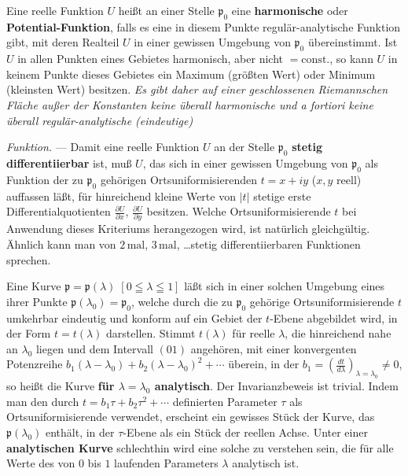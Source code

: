 \documentclass{article}
\begin{document}
Eine reelle Funktion $U$ heißt an einer Stelle $\mathfrak{p}_0$ eine \textbf{harmonische} oder \textbf{Potential-Funktion}, falls es eine in diesem Punkte regulär-analytische Funktion gibt, mit deren Realteil $U$ in einer gewissen Umgebung von $\mathfrak{p}_0$ übereinstimmt. Ist $U$ in allen Punkten eines Gebietes harmonisch, aber nicht $=\mathrm{const.}$, so kann $U$ in keinem Punkte dieses Gebietes ein Maximum (größten Wert) oder Minimum (kleinsten Wert) besitzen. \emph{Es gibt daher auf einer geschlossenen Riemannschen Fläche außer der Konstanten keine überall harmonische und a fortiori keine überall regulär-analytische (eindeutige)}

\emph{Funktion.} --- Damit eine reelle Funktion $U$ an der Stelle $\mathfrak{p}_0$ \textbf{stetig differentiierbar} ist, muß $U$, das sich in einer gewissen Umgebung von $\mathfrak{p}_0$ als Funktion der zu $\mathfrak{p}_0$ gehörigen Ortsuniformisierenden $t = x + iy$ ($x, y$ reell) auffassen läßt, für hinreichend kleine Werte von $|t|$ stetige erste Differentialquotienten $\frac{\partial U}{\partial x}$, $\frac{\partial U}{\partial y}$ besitzen. Welche Ortsuniformisierende $t$ bei Anwendung dieses Kriteriums herangezogen wird, ist natürlich gleichgültig. Ähnlich kann man von $2\,\text{mal}$, $3\,\text{mal}$, \ldots stetig differentiierbaren Funktionen sprechen.

Eine Kurve $\mathfrak{p} = \mathfrak{p}(\lambda)\;[0 \leqq \lambda \leqq 1]$ läßt sich in einer solchen Umgebung eines ihrer Punkte $\mathfrak{p}(\lambda_0) = \mathfrak{p}_0$, welche durch die zu $\mathfrak{p}_0$ gehörige Ortsuniformisierende $t$ umkehrbar eindeutig und konform auf ein Gebiet der $t$-Ebene abgebildet wird, in der Form $t = t(\lambda)$ darstellen. Stimmt $t(\lambda)$ für reelle $\lambda$, die hinreichend nahe an $\lambda_0$ liegen und dem Intervall $(01)$ angehören, mit einer konvergenten Potenzreihe $b_1 (\lambda - \lambda_0) + b_2 (\lambda - \lambda_0)^2 + \cdots$ überein, in der $b_1 = \left(\frac{dt}{d\lambda}\right)_{\lambda = \lambda_0} \neq 0$, so heißt die Kurve \textbf{für $\lambda = \lambda_0$ analytisch}. Der Invarianzbeweis ist trivial. Indem man den durch $t = b_1 \tau + b_2 \tau^2 + \cdots$ definierten Parameter $\tau$ als Ortsuniformisierende verwendet, erscheint ein gewisses Stück der Kurve, das $\mathfrak{p}(\lambda_0)$ enthält, in der $\tau$-Ebene als ein Stück der reellen Achse. Unter einer \textbf{analytischen Kurve} schlechthin wird eine solche zu verstehen sein, die für alle Werte des von $0$ bis $1$ laufenden Parameters $\lambda$ analytisch ist.
\end{document}
